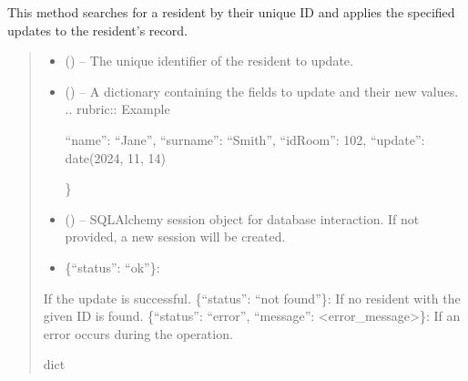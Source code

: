 \documentclass[letterpaper,10pt,english]{sphinxmanual}
\begin{document}
\begin{fulllineitems}
\begin{fulllineitems}
\sphinxAtStartPar
This method searches for a resident by their unique ID and applies the specified updates
to the resident’s record.
\begin{quote}\begin{description}
\begin{itemize}
\item {} 
\sphinxAtStartPar
{} () – The unique identifier of the resident to update.

\item {} 
\sphinxAtStartPar
{} () – 
\sphinxAtStartPar
A dictionary containing the fields to update and their new values.
.. rubric:: Example
\begin{description}
\sphinxlineitem{\{}
\sphinxAtStartPar
“name”: “Jane”,
“surname”: “Smith”,
“idRoom”: 102,
“update”: date(2024, 11, 14)

\end{description}

\sphinxAtStartPar
\}


\item {} 
\sphinxAtStartPar
{} (\sphinxstyleliteralemphasis{\sphinxupquote{, }}) – SQLAlchemy session object for database interaction.
If not provided, a new session will be created.

\end{itemize}

\sphinxAtStartPar
\begin{description}
\begin{itemize}
\item {} 
\sphinxAtStartPar
\{“status”: “ok”\}:

\end{itemize}

\sphinxAtStartPar
If the update is successful.
\sphinxhyphen{} \{“status”: “not found”\}:
If no resident with the given ID is found.
\sphinxhyphen{} \{“status”: “error”, “message”: <error\_message>\}:
If an error occurs during the operation.

\end{description}


\sphinxAtStartPar
dict


\end{description}
\end{quote}
\end{fulllineitems}
\end{fulllineitems}
\end{document}
